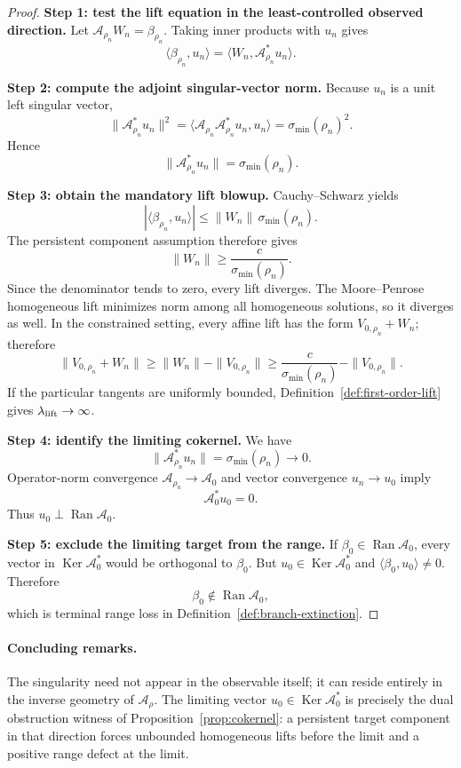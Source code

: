 \documentclass[12pt]{article}
\newcommand{\Ran}{\operatorname{Ran}}
\newcommand{\Ker}{\operatorname{Ker}}
\newcommand{\Comp}{\mathscr A}
\begin{document}
\begin{proof}
\textbf{Step 1: test the lift equation in the least-controlled observed direction.}
Let $\Comp_{\rho_n}W_n=\beta_{\rho_n}$. Taking inner products with $u_n$ gives
\[
\langle\beta_{\rho_n},u_n\rangle
=\langle W_n,\Comp_{\rho_n}^*u_n\rangle.
\]

\textbf{Step 2: compute the adjoint singular-vector norm.}
Because $u_n$ is a unit left singular vector,
\[
\|\Comp_{\rho_n}^*u_n\|^2
=\langle \Comp_{\rho_n}\Comp_{\rho_n}^*u_n,u_n\rangle
=\sigma_{\min}(\rho_n)^2.
\]
Hence
\[
\|\Comp_{\rho_n}^*u_n\|=\sigma_{\min}(\rho_n).
\]

\textbf{Step 3: obtain the mandatory lift blowup.}
Cauchy--Schwarz yields
\[
|\langle\beta_{\rho_n},u_n\rangle|
\le \|W_n\|\,\sigma_{\min}(\rho_n).
\]
The persistent component assumption therefore gives
\[
\|W_n\|\ge \frac{c}{\sigma_{\min}(\rho_n)}.
\]
Since the denominator tends to zero, every lift diverges. The Moore--Penrose homogeneous lift minimizes norm among all homogeneous solutions, so it diverges as well. In the constrained setting, every affine lift has the form $V_{0,\rho_n}+W_n$; therefore
\[
\|V_{0,\rho_n}+W_n\|
\ge \|W_n\|-\|V_{0,\rho_n}\|
\ge \frac{c}{\sigma_{\min}(\rho_n)}-\|V_{0,\rho_n}\|.
\]
If the particular tangents are uniformly bounded, Definition~\ref{def:first-order-lift} gives $\lambda_{\rm lift}\to\infty$.

\textbf{Step 4: identify the limiting cokernel.}
We have
\[
\|\Comp_{\rho_n}^*u_n\|=\sigma_{\min}(\rho_n)\to0.
\]
Operator-norm convergence $\Comp_{\rho_n}\to\Comp_0$ and vector convergence $u_n\to u_0$ imply
\[
\Comp_0^*u_0=0.
\]
Thus $u_0\perp\Ran\Comp_0$.

\textbf{Step 5: exclude the limiting target from the range.}
If $\beta_0\in\Ran\Comp_0$, every vector in $\Ker\Comp_0^*$ would be orthogonal to $\beta_0$. But $u_0\in\Ker\Comp_0^*$ and $\langle\beta_0,u_0\rangle\neq0$. Therefore
\[
\beta_0\notin\Ran\Comp_0,
\]
which is terminal range loss in Definition~\ref{def:branch-extinction}.
\end{proof}

\paragraph{Concluding remarks.}
The singularity need not appear in the observable itself; it can reside entirely in the inverse geometry of $\Comp_\rho$. The limiting vector $u_0\in\Ker\Comp_0^*$ is precisely the dual obstruction witness of Proposition~\ref{prop:cokernel}: a persistent target component in that direction forces unbounded homogeneous lifts before the limit and a positive range defect at the limit.
\end{document}
